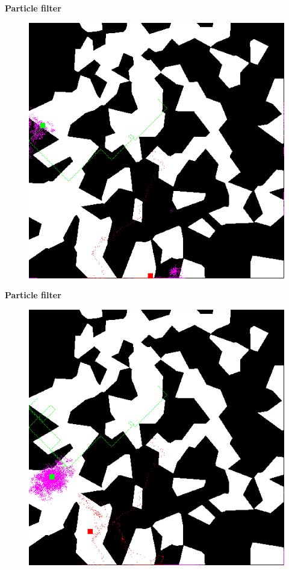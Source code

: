 \documentclass[xcolor=dvipsnames]{beamer}
\begin{document}
\begin{frame}{\bf Particle filter}

\begin{figure}[htbp]
  \centering
   \includegraphics[scale=0.4]{../pictures/00270.png}
\end{figure}

\end{frame}


\begin{frame}{\bf Particle filter}

\begin{figure}[htbp]
  \centering
   \includegraphics[scale=0.4]{../pictures/00500.png}
\end{figure}

\end{frame}
\end{document}
